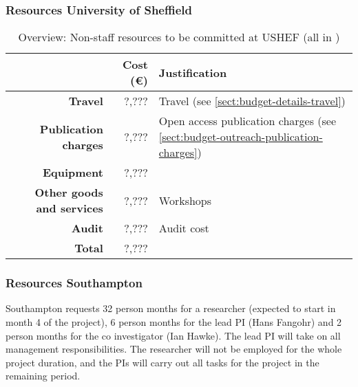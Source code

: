 \subsubsection{Resources University of Sheffield}


\bigskip
\begin{table}[H]
\begin{tabular}{|r|r|p{9cm}|}
\hline
\textbf{} & \textbf{Cost (\euro)} & \textbf{Justification} \\\hline
\textbf{Travel} & ?,??? & Travel (see \ref{sect:budget-details-travel})\\\hline
\textbf{Publication charges} & ?,??? & Open access publication charges (see \ref{sect:budget-outreach-publication-charges})\\\hline
\textbf{Equipment} & ?,??? &  \\\hline    %

\textbf{Other goods and services} & ?,??? & Workshops \\\hline   %
\textbf{Audit} & ?,??? & Audit cost \\\hline
\textbf{Total} & ?,???\\\cline{1-2}
\end{tabular}
\caption{Overview: Non-staff resources to be committed at USHEF (all in \texteuro)}\vspace*{-1em}
\end{table}





\subsubsection{Resources Southampton}

Southampton requests 32 person months for a researcher (expected to
start in month 4 of the project), 6 person months for the lead PI
(Hans Fangohr) and 2 person months for the co investigator (Ian
Hawke). The lead PI will take on all management responsibilities. The
researcher will not be employed for the whole project duration, and
the PIs will carry out all tasks for the project in the remaining
period.

